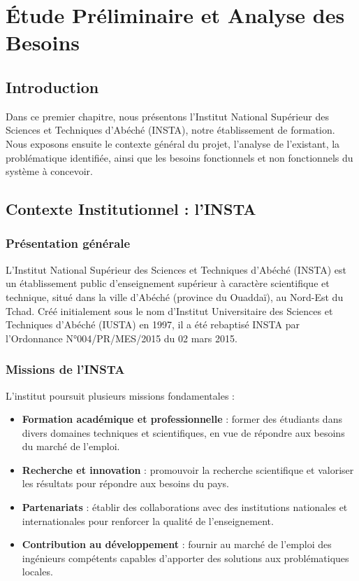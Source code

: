 \chapter{Étude Préliminaire et Analyse des Besoins}

\section*{Introduction}

Dans ce premier chapitre, nous présentons l'Institut National Supérieur des Sciences et Techniques d'Abéché (INSTA), notre établissement de formation. Nous exposons ensuite le contexte général du projet, l'analyse de l'existant, la problématique identifiée, ainsi que les besoins fonctionnels et non fonctionnels du système à concevoir.

\section{Contexte Institutionnel : l'INSTA}

\subsection{Présentation générale}

L'Institut National Supérieur des Sciences et Techniques d'Abéché (INSTA) est un établissement public d'enseignement supérieur à caractère scientifique et technique, situé dans la ville d'Abéché (province du Ouaddaï), au Nord-Est du Tchad. Créé initialement sous le nom d'Institut Universitaire des Sciences et Techniques d'Abéché (IUSTA) en 1997, il a été rebaptisé INSTA par l'Ordonnance N°004/PR/MES/2015 du 02 mars 2015.

\subsection{Missions de l'INSTA}

L'institut poursuit plusieurs missions fondamentales :

\begin{itemize}
    \item \textbf{Formation académique et professionnelle} : former des étudiants dans divers domaines techniques et scientifiques, en vue de répondre aux besoins du marché de l'emploi.
    \item \textbf{Recherche et innovation} : promouvoir la recherche scientifique et valoriser les résultats pour répondre aux besoins du pays.
    \item \textbf{Partenariats} : établir des collaborations avec des institutions nationales et internationales pour renforcer la qualité de l'enseignement.
    \item \textbf{Contribution au développement} : fournir au marché de l'emploi des ingénieurs compétents capables d'apporter des solutions aux problématiques locales.
\end{itemize}

